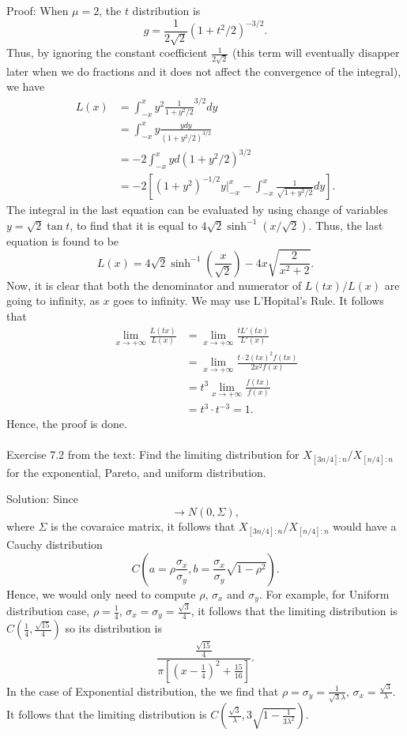 \documentclass[11pt]{article} \pagestyle{plain}
\def\beq{\begin{equation}}
\def\eeq{\end{equation}}
\begin{document}
\noindent Proof: When $\mu = 2$, the $t$ distribution is \beq g = \frac{1}{2\sqrt{2}}(1+t^{2}/2)^{-3/2}.\eeq
Thus, by ignoring the constant coefficient $\frac{1}{2\sqrt{2}}$ (this term will eventually disapper later when we do fractions and it does not affect the convergence of the integral), we have \begin{align*}L(x) &= \int_{-x}^{x}y^{2}\frac{1}{1+y^{2}/2}^{3/2}dy \\ & = \int_{-x}^{x}y\frac{ydy}{(1+y^{2}/2)^{3/2}} \\ & = -2 \int_{-x}^{x} yd(1+y^{2}/2)^{3/2} \\ & = -2\left[(1+y^{2})^{-1/2}y\Bigg|_{-x}^{x} -\int_{-x}^{x}\frac{1}{\sqrt{1+y^{2}/2}}dy\right].\end{align*} 
The integral in the last equation can be evaluated by using change of variables $y = \sqrt{2}\tan{t}$, to find that it is equal to $4\sqrt{2}\sinh^{-1}(x/\sqrt{2})$. Thus, the last equation is found to be \beq L(x) = 4\sqrt{2}\sinh^{-1}\left(\frac{x}{\sqrt{2}}\right) - 4x\sqrt{\frac{2}{x^{2}+2}}.\eeq
Now, it is clear that both the denominator and numerator of $L(tx)/L(x)$ are going to infinity, as $x$ goes to infinity. We may use L'Hopital's Rule. It follows that 
\begin{align*} \lim_{x\to+\infty}\frac{L(tx)}{L(x)} &= \lim_{x\to+\infty}\frac{tL'(tx)}{L'(x)} \\ & =\lim_{x\to+\infty} \frac{t\cdot 2(tx)^{2}f(tx)}{2x^{2}f(x)} \\& = t^{3}\lim_{x\to+\infty} \frac{f(tx)}{f(x)} \\ & = t^{3}\cdot t^{-3} = 1.\end{align*} Hence, the proof is done.\\\\


\noindent Exercise 7.2 from the text: Find the limiting distribution for $X_{[3n/4]:n}/X_{[n/4]:n}$ for the exponential, Pareto, and uniform distribution.

\noindent Solution: Since \beq [(\sqrt{n}X_{k1:n}, \sqrt{n}X_{k2:n})-(\epsilon_{1/4}, \epsilon_{3/4})] \to N(0,\Sigma),\eeq
where $\Sigma$ is the covaraice matrix, it follows that $X_{[3n/4]:n}/X_{[n/4]:n}$ would have a Cauchy distribution 
\beq C(a = \rho \frac{\sigma_{x}}{\sigma_{y}}, b = \frac{\sigma_{x}}{\sigma_{y}}\sqrt{1-\rho^{2}}).\eeq
Hence, we would only need to compute $\rho$, $\sigma_{x}$ and $\sigma_{y}$.  For example, for Uniform distribution case, $\rho = \frac{1}{4}$, $\sigma_{x} = \sigma_{y} = \frac{\sqrt{3}}{4}$, it follows that the limiting distribution is $C(\frac{1}{4}, \frac{\sqrt{15}}{4})$ so its distribution is \beq \frac{\frac{\sqrt{15}}{4}}{\pi [(x-\frac{1}{4})^{2}+\frac{15}{16}]}.\eeq
In the case of Exponential distribution, the we find that $\rho = \sigma_{y} = \frac{1}{\sqrt{3}\lambda}$, $\sigma_{x} = \frac{\sqrt{3}}{\lambda}$. It follows that the limiting distribution is $C(\frac{\sqrt{3}}{\lambda}, 3\sqrt{1-\frac{1}{3\lambda^{2}}})$.\\\\
\end{document}
